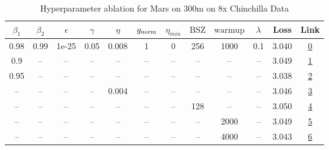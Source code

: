 \begin{table}[H]
\centering
\caption{Hyperparameter ablation for Mars on 300m on 8x Chinchilla Data}
\label{tab:ablation_mars_300m_on_8x_chinchilla_data}
\begin{tabular}{cccccccccccc}
\toprule
$\beta_1$ & $\beta_2$ & $\epsilon$ & $\gamma$ & $\eta$ & $g_{\mathrm{norm}}$ & $\eta_{min}$ & $\mathrm{BSZ}$ & $\mathrm{warmup}$ & $\lambda$ & Loss & Link \\
\midrule
0.98 & 0.99 & 1e-25 & 0.05 & 0.008 & 1 & 0 & 256 & 1000 & 0.1 & 3.040 & \href{https://wandb.ai/marin-community/optimizer-scaling/runs/sweep-300m-48B-mars3a0394lr0.008-wd0.1-minlr0-warmup1000-b10.98--b18370}{0} \\
\midrule
0.9 & -- & -- & -- & -- & -- & -- & -- & -- & -- & 3.049 & \href{https://wandb.ai/marin-community/optimizer-scaling/runs/sweep-300m-48B-mars4c3c64lr0.008-wd0.1-minlr0-warmup1000-b10.9-b-ccb8c7}{1} \\
0.95 & -- & -- & -- & -- & -- & -- & -- & -- & -- & 3.038 & \href{https://wandb.ai/marin-community/optimizer-scaling/runs/sweep-300m-48B-mars1b232dlr0.008-wd0.1-minlr0-warmup1000-b10.95--2bd6f5}{2} \\
-- & -- & -- & -- & 0.004 & -- & -- & -- & -- & -- & 3.046 & \href{https://wandb.ai/marin-community/optimizer-scaling/runs/sweep-300m-48B-mars0f0b4flr0.004-wd0.1-minlr0-warmup1000-b10.98--98eb68}{3} \\
-- & -- & -- & -- & -- & -- & -- & 128 & -- & -- & 3.050 & \href{https://wandb.ai/marin-community/optimizer-scaling/runs/sweep-300m-48B-marsac45felr0.008-wd0.1-minlr0-warmup1000-b10.98--af6362}{4} \\
-- & -- & -- & -- & -- & -- & -- & -- & 2000 & -- & 3.049 & \href{https://wandb.ai/marin-community/optimizer-scaling/runs/sweep-300m-48B-marsfe179elr0.008-wd0.1-minlr0-warmup2000-b10.98--8b1315}{5} \\
-- & -- & -- & -- & -- & -- & -- & -- & 4000 & -- & 3.043 & \href{https://wandb.ai/marin-community/optimizer-scaling/runs/sweep-300m-48B-mars529c1blr0.008-wd0.1-minlr0-warmup4000-b10.98--47eaf7}{6} \\
\bottomrule
\end{tabular}
\end{table}


